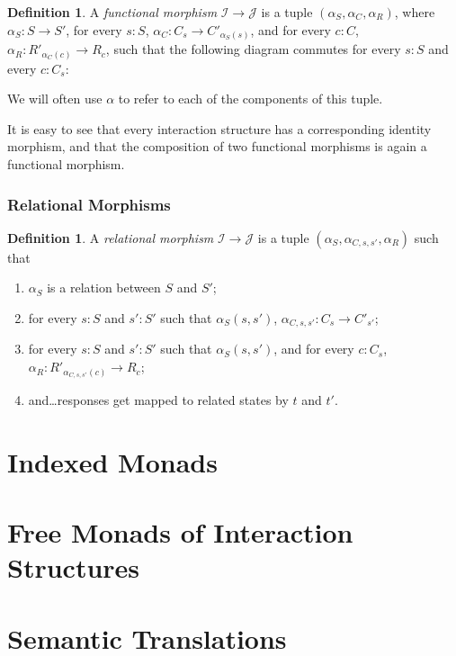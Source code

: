 \documentclass{article}
\theoremstyle{definition}
\newtheorem{definition}[theorem]{Definition}
\begin{document}
    \begin{definition}
        A \emph{functional morphism} $\mathcal{I} \to \mathcal{J}$ is a tuple $(\alpha_S, \alpha_C, \alpha_R)$, where
        $\alpha_S : S \to S'$, for every $s : S$, $\alpha_C : C_s \to C'_{\alpha_S(s)}$, and for every $c : C$, $\alpha_R
        : R'_{\alpha_C(c)} \to R_c$, such that the following diagram commutes for every $s : S$ and every $c : C_s$:
        \begin{center}
        \end{center}
    \end{definition}

    We will often use $\alpha$ to refer to each of the components of this tuple.

    It is easy to see that every interaction structure has a corresponding identity morphism, and that the composition
    of two functional morphisms is again a functional morphism.

    \subsubsection{Relational Morphisms}

    \begin{definition}
        A \emph{relational morphism} $\mathcal{I} \to \mathcal{J}$ is a tuple $(\alpha_S, \alpha_{C, s, s'}, \alpha_R)$
        such that
        \begin{enumerate}
            \item $\alpha_S$ is a relation between $S$ and $S'$;
            \item for every $s : S$ and $s' : S'$ such that  $\alpha_S(s, s')$, $\alpha_{C, s, s'} : C_s \to C'_{s'}$;
            \item for every $s : S$ and $s' : S'$ such that $\alpha_S(s, s')$, and for every $c : C_s$, $\alpha_R :
                R'_{\alpha_{C, s, s'}(c)} \to R_c$;
            \item and\ldots responses get mapped to related states by $t$ and $t'$.  
        \end{enumerate}
    \end{definition}
    \section{Indexed Monads}

    \section{Free Monads of Interaction Structures}

    \section{Semantic Translations}
\end{document}

